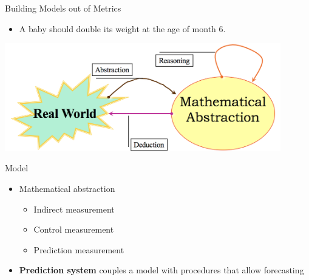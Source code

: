 \documentclass{beamer}
\begin{document}
\begin{frame}{\centerline{Building Models out of Metrics}}

\begin{itemize} 
\item A baby should double its weight at the age of month 6.
\end{itemize}
\begin{center}
\includegraphics[width=120mm]{A2022.ScaleDeiDati/img-img19.png}
\end{center}
\end{frame}

\begin{frame}{\centerline{Model}}

\begin{itemize} 
\item Mathematical abstraction
\begin{itemize}
    \item Indirect measurement
    \item Control measurement
    \item Prediction measurement
\end{itemize}    
\item \textbf{Prediction system} couples a model with procedures that allow forecasting
\end{itemize}

\end{frame}
\end{document}
